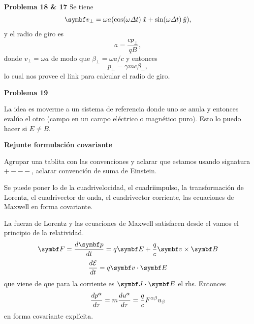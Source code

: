 \documentclass[10pt,oneside]{CBFT_book}
\begin{document}
\begin{ejemplo}{\bf Problema 18 \& 17}
Se tiene
\[
	\vb{v}_\perp = \omega a ( \cos(\omega\Delta t) \xver + \sin(\omega\Delta t)\yver ),
\]
y el radio de giro es
\[
	a = \frac{ c p_\perp }{ q B },
\]
donde $ v_\perp = \omega a $ de modo que $\beta_\perp = \omega a / c $ y entonces
\[
	p_\perp = \gamma m c \beta_\perp,
\]
lo cual nos provee el link para calcular el radio de giro.
 
\end{ejemplo}

\begin{ejemplo}{\bf Problema 19}

La idea es moverme a un sistema de referencia donde uno se anula y entonces evalúo el otro
(campo en un campo eléctrico o magnético puro). Esto lo puedo hacer si $E \neq B$.

\end{ejemplo}


\begin{ejemplo}{\bf Rejunte formulación covariante}

Agrupar una tablita con las convenciones y aclarar que estamos usando signatura $+---$,
aclarar convención de suma de Einstein.

Se puede poner lo de la cuadrivelocidad, el cuadriimpulso, la transformación de Lorentz,
el cuadrivector de onda, el cuadrivector corriente, las ecuaciones de Maxwell en forma
covariante.

La fuerza de Lorentz y las ecuaciones de Maxwell satisfacen desde el vamos el principio
de la relatividad.
\[
	\vb{F} = \dtot{\vb{p}}{t} = q \vb{E} + \frac{q}{c} \pv{v}{B}
\]
\[
	\dtot{\mathcal{E}}{t} = q \pe{v}{E}
\]
que viene de que para la corriente es $\pe{J}{E}$ el rhs. Entonces
\[
	\frac{d^{\hspace{-0.05em}} {p^\alpha}}{d {\tau}^{\hspace{-0.05em}}} = m \frac{d^{\hspace{-0.05em}} {u^\alpha}}{d {\tau}^{\hspace{-0.05em}}} = \frac{q}{c} F^{\alpha\beta} u_\beta
\]
en forma covariante explícita.

\end{ejemplo}
\end{document}
